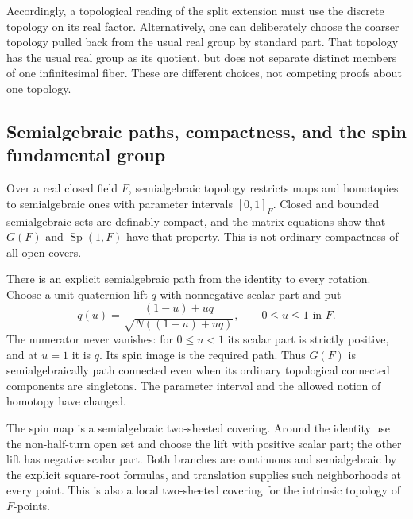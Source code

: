 \documentclass[11pt,letterpaper]{article}
\numberwithin{equation}{section}
\theoremstyle{definition}
\theoremstyle{remark}
\newcommand{\Sp}{\operatorname{Sp}}
\begin{document}
Accordingly, a topological reading of the split extension must use the discrete
topology on its real factor. Alternatively, one can deliberately choose the
coarser topology pulled back from the usual real group by standard part. That
topology has the usual real group as its quotient, but does not separate distinct
members of one infinitesimal fiber. These are different choices, not competing
proofs about one topology.

\subsection{Semialgebraic paths, compactness, and the spin fundamental group}

Over a real closed field \(F\), semialgebraic topology restricts maps and
homotopies to semialgebraic ones with parameter intervals \([0,1]_F\).
Closed and bounded semialgebraic sets are definably compact, and the matrix
equations show that \(G(F)\) and \(\Sp(1,F)\) have that property. This is not
ordinary compactness of all open covers.

There is an explicit semialgebraic path from the identity to every rotation.
Choose a unit quaternion lift \(q\) with nonnegative scalar part and put
\begin{equation}\label{e3:so:eq:sapath}
 q(u)=\frac{(1-u)+uq}{\sqrt{N((1-u)+uq)}},\qquad 0\le u\le1\text{ in }F.
\end{equation}
The numerator never vanishes: for \(0\le u<1\) its scalar part is strictly
positive, and at \(u=1\) it is \(q\). Its spin image is the
required path. Thus \(G(F)\) is semialgebraically path connected even when its
ordinary topological connected components are singletons. The parameter
interval and the allowed notion of homotopy have changed.

The spin map is a semialgebraic two-sheeted covering. Around the identity use
the non-half-turn open set and choose the lift with positive scalar part; the
other lift has negative scalar part. Both branches are continuous and
semialgebraic by the explicit square-root formulas, and translation supplies
such neighborhoods at every point. This is also a local two-sheeted covering
for the intrinsic topology of \(F\)-points.
\end{document}
